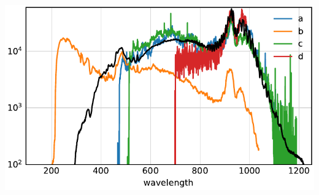 \begin{frame}
	\centering
	\includegraphics{../analysis/figures/efficiency_different.pdf}
\end{frame}